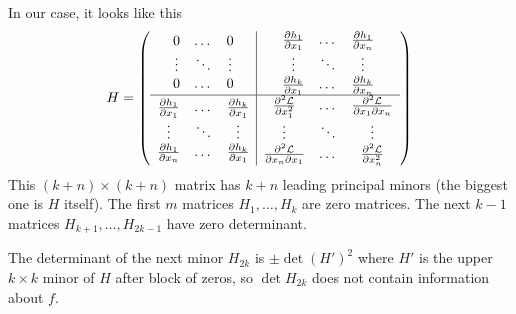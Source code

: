 \documentclass[10pt,a4paper]{book}
\theoremstyle{definition}\newtheorem{definition}{Definition}
\theoremstyle{definition}\newtheorem{fact}{Fact}
\theoremstyle{definition}\newtheorem{ex}{Ex.}
\theoremstyle{definition}\newtheorem{project}{Project}
\theoremstyle{definition}\newtheorem{problem}{Problem}
\theoremstyle{definition}\newtheorem{example}{Example}
\numberwithin{theorem}{chapter}
\numberwithin{corollary}{chapter}
\numberwithin{assumption}{chapter}
\numberwithin{definition}{chapter}
\numberwithin{prop}{chapter}
\numberwithin{notation}{chapter}
\numberwithin{problem}{chapter}
\numberwithin{example}{chapter}
\numberwithin{fact}{chapter}
\numberwithin{ex}{chapter}
\begin{document}
	In our case, it looks like this
	\begin{equation*}
		H = \left( \begin{array}{c | c}
			\begin{matrix}
				0      & \dots  & 0      \\
				\vdots & \ddots & \vdots \\
				0      & \dots  & 0      
			\end{matrix} & 
			\begin{matrix}
				\frac{\partial h_1}{\partial x_1} & \dots  & \frac{\partial h_1}{\partial x_n} \\
				\vdots                            & \ddots & \vdots                            \\
				\frac{\partial h_k}{\partial x_1} & \dots  & \frac{\partial h_k}{\partial x_n} 
			\end{matrix} \\
			\hline
			\begin{matrix}
				\frac{\partial h_1}{\partial x_1} & \dots & \frac{\partial h_k}{\partial x_1} \\
				\vdots                            & \ddots & \vdots                            \\
				\frac{\partial h_1}{\partial x_n} & \dots  & \frac{\partial h_k}{\partial x_1} 
			\end{matrix} & 
			\begin{matrix}
				\frac{\partial^2 \mathcal{L}}{\partial x_1^2}            & \dots  & \frac{\partial^2 \mathcal{L}}{\partial x_1 \partial x_n} \\
				\vdots                                                   & \ddots & \vdots                                                 \\
				\frac{\partial^2 \mathcal{L}}{\partial x_n \partial x_1} & \dots  & \frac{\partial^2 \mathcal{L}}{\partial x_n^2}          
			\end{matrix}
		\end{array} \right)
	\end{equation*}
	This $(k+n) \times (k+n)$ matrix has $k+n$ leading principal minors (the biggest one is $H$ itself). The first $m$ matrices $H_1, \dots , H_k$ are zero matrices. The next  $k - 1$ matrices $H_{k+1}, \dots , H_{2k-1}$ have zero determinant.
	
	The determinant of the next minor $H_{2k}$ is $\pm \det(H')^2$ where $H'$ is the upper $k \times k $ minor of $H$ after block of zeros, so $\det H_{2k}$ does not contain information about $f$.
	
\end{document}

